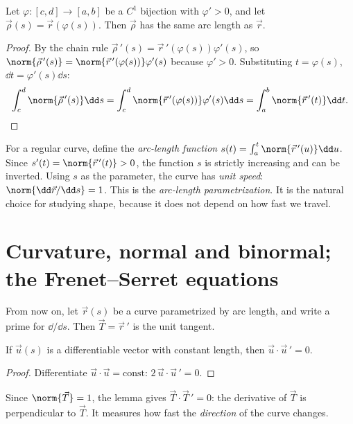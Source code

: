 \begin{proposition}\label{prop:reparam}
Let $\varphi:[c,d]\to[a,b]$ be a $C^1$ bijection with $\varphi'>0$, and let $\vec\rho(s)=\vec r(\varphi(s))$. Then $\vec\rho$ has the same arc length as $\vec r$.
\end{proposition}

\begin{proof}
By the chain rule $\vec\rho\,'(s)=\vec r\,'(\varphi(s))\varphi'(s)$, so $\norm{\vec\rho\,'(s)}=\norm{\vec r\,'(\varphi(s))}\varphi'(s)$ because $\varphi'>0$. Substituting $t=\varphi(s)$, $\dd t=\varphi'(s)\dd s$:
\[
\int_c^d\norm{\vec\rho\,'(s)}\dd s=\int_c^d\norm{\vec r\,'(\varphi(s))}\varphi'(s)\dd s=\int_a^b\norm{\vec r\,'(t)}\dd t.\qedhere
\]
\end{proof}

For a regular curve, define the \emph{arc-length function} $s(t)=\int_a^t\norm{\vec r\,'(u)}\dd u$. Since $s'(t)=\norm{\vec r\,'(t)}>0$, the function $s$ is strictly increasing and can be inverted. Using $s$ as the parameter, the curve has \emph{unit speed}: $\norm{\dd\vec r/\dd s}=1$. This is the \emph{arc-length parametrization}. It is the natural choice for studying shape, because it does not depend on how fast we travel.

\section{Curvature, normal and binormal; the Frenet--Serret equations}

From now on, let $\vec r(s)$ be a curve parametrized by arc length, and write a prime for $\dd/\dd s$. Then $\vec T=\vec r\,'$ is the unit tangent.

\begin{lemma}\label{lem:perp}
If $\vec u(s)$ is a differentiable vector with constant length, then $\vec u\cdot\vec u\,'=0$.
\end{lemma}

\begin{proof}
Differentiate $\vec u\cdot\vec u=\text{const}$: $2\,\vec u\cdot\vec u\,'=0$.
\end{proof}

Since $\norm{\vec T}=1$, the lemma gives $\vec T\cdot\vec T\,'=0$: the derivative of $\vec T$ is perpendicular to $\vec T$. It measures how fast the \emph{direction} of the curve changes.

